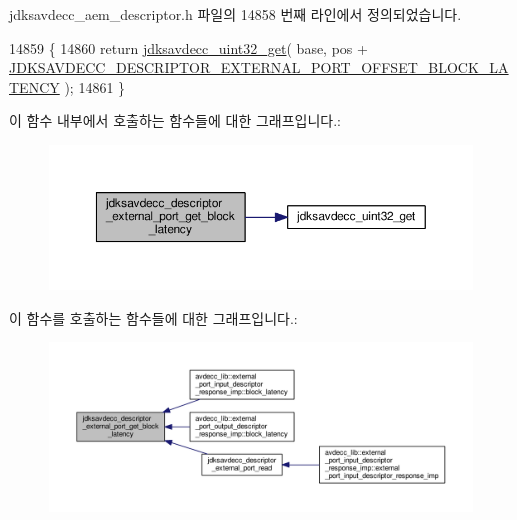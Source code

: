 jdksavdecc\+\_\+aem\+\_\+descriptor.\+h 파일의 14858 번째 라인에서 정의되었습니다.


\begin{DoxyCode}
14859 \{
14860     \textcolor{keywordflow}{return} \hyperlink{group__endian_gaefcf5bd4f368997a82f358ab89052d6b}{jdksavdecc\_uint32\_get}( base, pos + 
      \hyperlink{group__descriptor__external__port_gabecb7dc4c4398be42046ac10cfabb3ac}{JDKSAVDECC\_DESCRIPTOR\_EXTERNAL\_PORT\_OFFSET\_BLOCK\_LATENCY}
       );
14861 \}
\end{DoxyCode}


이 함수 내부에서 호출하는 함수들에 대한 그래프입니다.\+:
\nopagebreak
\begin{figure}[H]
\begin{center}
\leavevmode
\includegraphics[width=350pt]{group__descriptor__external__port_ga12e301300dd4da726c3327f8a28538a9_cgraph}
\end{center}
\end{figure}




이 함수를 호출하는 함수들에 대한 그래프입니다.\+:
\nopagebreak
\begin{figure}[H]
\begin{center}
\leavevmode
\includegraphics[width=350pt]{group__descriptor__external__port_ga12e301300dd4da726c3327f8a28538a9_icgraph}
\end{center}
\end{figure}


